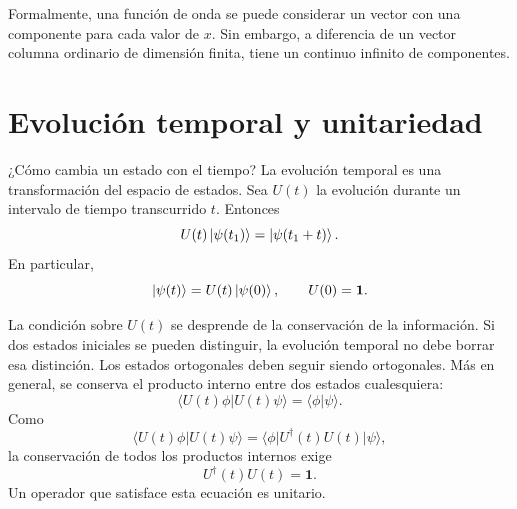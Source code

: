 Formalmente, una función de onda se puede considerar un vector con una componente para cada valor de \(x\). Sin embargo, a diferencia de un vector columna ordinario de dimensión finita, tiene un continuo infinito de componentes.

\begin{classroomqa}
\end{classroomqa}

\section{Evolución temporal y unitariedad}

¿Cómo cambia un estado con el tiempo? La evolución temporal es una transformación del espacio de estados. Sea \(U(t)\) la evolución durante un intervalo de tiempo transcurrido \(t\). Entonces
\begin{equation}
U(t)\left\lvert\psi(t_1)\right\rangle=\left\lvert\psi(t_1+t)\right\rangle.
\end{equation}
En particular,
\begin{equation}
\left\lvert\psi(t)\right\rangle=U(t)\left\lvert\psi(0)\right\rangle,
\qquad
U(0)=\mathbf 1.
\end{equation}

La condición sobre \(U(t)\) se desprende de la conservación de la información. Si dos estados iniciales se pueden distinguir, la evolución temporal no debe borrar esa distinción. Los estados ortogonales deben seguir siendo ortogonales. Más en general, se conserva el producto interno entre dos estados cualesquiera:
\begin{equation}
\langle U(t)\phi|U(t)\psi\rangle
=\langle\phi|\psi\rangle.
\end{equation}
Como
\begin{equation}
\langle U(t)\phi|U(t)\psi\rangle
=\langle\phi|U^\dagger(t)U(t)|\psi\rangle,
\end{equation}
la conservación de todos los productos internos exige
\begin{equation}
U^\dagger(t)U(t)=\mathbf 1.
\end{equation}
Un operador que satisface esta ecuación es unitario.

